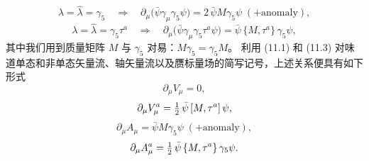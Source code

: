 \begin{equation}
\lambda = \hat{\lambda} = \gamma_5 \quad\Rightarrow\quad
\partial_\mu\bigl(\bar{\psi}\gamma_\mu\gamma_5\psi\bigr) = 2\,\bar{\psi}M\gamma_5\psi
\;(+\mathrm{anomaly}) ,
\end{equation}
\begin{equation}
\lambda = \hat{\lambda} = \gamma_5\tau^a \quad\Rightarrow\quad
\partial_\mu\bigl(\bar{\psi}\gamma_\mu\gamma_5\tau^a\psi\bigr)
= \bar{\psi}\,\{M,\tau^a\}\,\gamma_5\psi ,
\end{equation}
其中我们用到质量矩阵 $M$ 与 $\gamma_5$ 对易：$M\gamma_5 = \gamma_5 M$。
利用 (11.1) 和 (11.3) 对味道单态和非单态矢量流、轴矢量流以及赝标量场的简写记号，上述关系便具有如下形式
\begin{equation}
\partial_\mu V_\mu = 0 ,
\end{equation}
\begin{equation}
\partial_\mu V_\mu^a = \tfrac{1}{2}\,\bar{\psi}\,[M,\tau^a]\,\psi ,
\end{equation}
\begin{equation}
\partial_\mu A_\mu = \bar{\psi}M\gamma_5\psi \;(+\mathrm{anomaly}) ,
\end{equation}
\begin{equation}
\partial_\mu A_\mu^a = \tfrac{1}{2}\,\bar{\psi}\,\{M,\tau^a\}\,\gamma_5\psi .
\end{equation}

